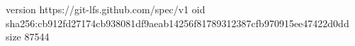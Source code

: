 version https://git-lfs.github.com/spec/v1
oid sha256:cb912fd27174cb938081df9aeab14256f81789312387cfb970915ee47422d0dd
size 87544
